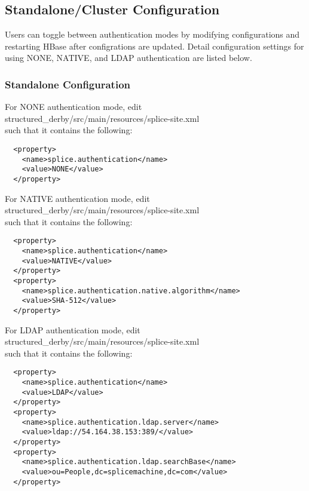 \documentclass{article}
\begin{document}
\subsection{Standalone/Cluster Configuration}
Users can toggle between authentication modes by modifying configurations and restarting HBase after configrations are updated. Detail configuration settings for using NONE, NATIVE, and LDAP authentication are listed below. 

\subsubsection{Standalone Configuration}
For NONE authentication mode, edit \\ structured\_derby/src/main/resources/splice-site.xml \\ 
such that it contains the following:
\begin{lstlisting}
  <property> 
    <name>splice.authentication</name> 
    <value>NONE</value> 
  </property> 
\end{lstlisting}
For NATIVE authentication mode, edit \\ structured\_derby/src/main/resources/splice-site.xml \\ 
such that it contains the following: 
\begin{lstlisting}
  <property> 
    <name>splice.authentication</name> 
    <value>NATIVE</value> 
  </property> 
  <property> 
    <name>splice.authentication.native.algorithm</name> 
    <value>SHA-512</value> 
  </property> 
\end{lstlisting}
For LDAP authentication mode, edit \\ structured\_derby/src/main/resources/splice-site.xml \\ such that it contains the following: 
\begin{lstlisting}
  <property> 
    <name>splice.authentication</name> 
    <value>LDAP</value> 
  </property> 
  <property> 
    <name>splice.authentication.ldap.server</name> 
    <value>ldap://54.164.38.153:389/</value> 
  </property> 
  <property> 
    <name>splice.authentication.ldap.searchBase</name> 
    <value>ou=People,dc=splicemachine,dc=com</value> 
  </property> 
\end{lstlisting}
\end{document}
